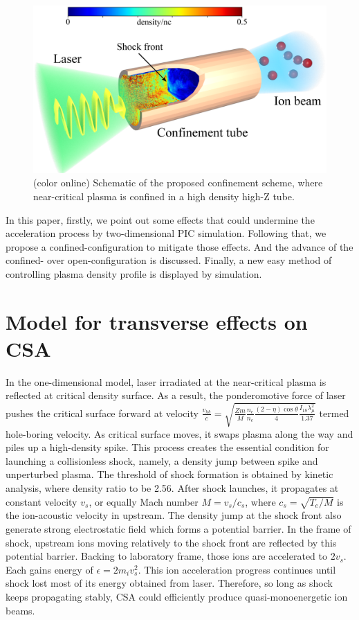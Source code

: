 \documentclass[12pt]{iopart}
\begin{document}
\begin{figure}
    \includegraphics[width=15cm]{sketch.eps}
    \caption{(color online) Schematic of the proposed confinement scheme, where near-critical plasma is confined in a high density high-Z tube.} \label{fig:sketch}
\end{figure}

In this paper, firstly, we point out some effects that could undermine the acceleration process by two-dimensional PIC simulation. Following that, we propose a confined-configuration to mitigate those effects. And the advance of the confined- over open-configuration is discussed. Finally, a new easy method of controlling plasma density profile is displayed by simulation. 
 
\section{Model for transverse effects on CSA}
\label{theory}
 
In the one-dimensional model, laser irradiated at the near-critical plasma is reflected at critical density surface. As a result, the ponderomotive force of laser pushes the critical surface forward at velocity $\frac{v_{hb}}{c}=\sqrt{\frac{Z m}{M}\frac{n_c}{n_e}\frac{(2-\eta)\cos\theta}{4}\frac{I_{18} \lambda_{\mu}^2}{1.37}}$ termed hole-boring velocity\cite{gibbon_short_2005}. As critical surface moves, it swaps plasma along the way and piles up a high-density spike. This process creates the essential condition for launching a collisionless shock, namely, a density jump between spike and unperturbed plasma. The threshold of shock formation is obtained by kinetic analysis, where density ratio to be 2.56. After shock launches, it propagates at constant velocity $v_{s}$, or equally Mach number $M=v_s/c_s$, where $c_s=\sqrt{T_e/M}$ is the ion-acoustic velocity in upstream. The density jump at the shock front also generate strong electrostatic field which forms a potential barrier. In the frame of shock, upstream ions moving relatively to the shock front are reflected by this potential barrier. Backing to laboratory frame, those ions are accelerated to $2v_s$. Each gains energy of $\epsilon=2m_i v_s^2$.  This ion acceleration progress continues until shock lost most of its energy obtained from laser. Therefore, so long as shock keeps propagating stably, CSA could efficiently produce quasi-monoenergetic ion beams.
\end{document}
